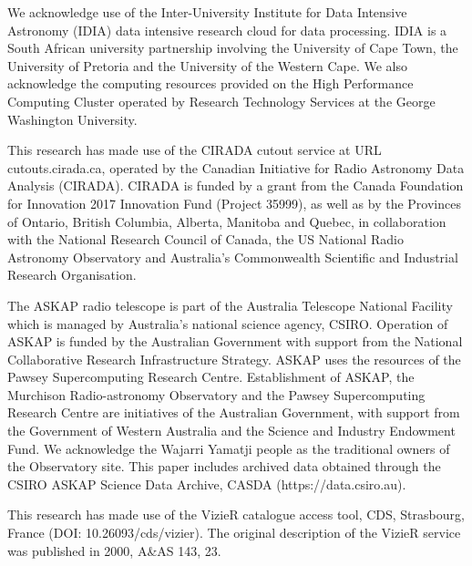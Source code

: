 \documentclass[12pt]{article}
\begin{document}
We acknowledge use of the Inter-University Institute for Data Intensive Astronomy (IDIA) data intensive research cloud for data processing. IDIA is a South African university partnership involving the University of Cape Town, the University of Pretoria and the University of the Western Cape. We also acknowledge the computing resources provided on the High Performance Computing Cluster operated by Research Technology Services at the George Washington University.

This research has made use of the CIRADA cutout service at URL cutouts.cirada.ca, operated by the Canadian Initiative for Radio Astronomy Data Analysis (CIRADA). CIRADA is funded by a grant from the Canada Foundation for Innovation 2017 Innovation Fund (Project 35999), as well as by the Provinces of Ontario, British Columbia, Alberta, Manitoba and Quebec, in collaboration with the National Research Council of Canada, the US National Radio Astronomy Observatory and Australia’s Commonwealth Scientific and Industrial Research Organisation.

The ASKAP radio telescope is part of the Australia Telescope National Facility which is managed by Australia’s national science agency, CSIRO. Operation of ASKAP is funded by the Australian Government with support from the National Collaborative Research Infrastructure Strategy. ASKAP uses the resources of the Pawsey Supercomputing Research Centre. Establishment of ASKAP, the Murchison Radio-astronomy Observatory and the Pawsey Supercomputing Research Centre are initiatives of the Australian Government, with support from the Government of Western Australia and the Science and Industry Endowment Fund. We acknowledge the Wajarri Yamatji people as the traditional owners of the Observatory site. This paper includes archived data obtained through the CSIRO ASKAP Science Data Archive, CASDA (https://data.csiro.au).

This research has made use of the VizieR catalogue access tool, CDS, Strasbourg, France (DOI: 10.26093/cds/vizier). The original description of the VizieR service was published in 2000, A\&AS 143, 23.
\end{document}
